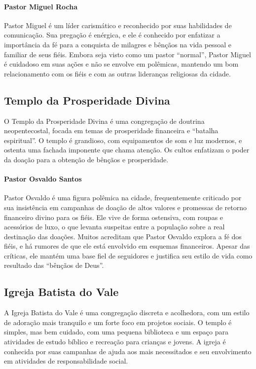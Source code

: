 \paragraph{Pastor Miguel Rocha}  
Pastor Miguel é um líder carismático e reconhecido por suas habilidades de comunicação. Sua pregação é enérgica, e ele é conhecido por enfatizar a importância da fé para a conquista de milagres e bênçãos na vida pessoal e familiar de seus fiéis. Embora seja visto como um pastor “normal”, Pastor Miguel é cuidadoso em suas ações e não se envolve em polêmicas, mantendo um bom relacionamento com os fiéis e com as outras lideranças religiosas da cidade.

\subsection{Templo da Prosperidade Divina}

O Templo da Prosperidade Divina é uma congregação de doutrina neopentecostal, focada em temas de prosperidade financeira e “batalha espiritual”. O templo é grandioso, com equipamentos de som e luz modernos, e ostenta uma fachada imponente que chama atenção. Os cultos enfatizam o poder da doação para a obtenção de bênçãos e prosperidade.

\paragraph{Pastor Osvaldo Santos}  
Pastor Osvaldo é uma figura polêmica na cidade, frequentemente criticado por sua insistência em campanhas de doação de altos valores e promessas de retorno financeiro divino para os fiéis. Ele vive de forma ostensiva, com roupas e acessórios de luxo, o que levanta suspeitas entre a população sobre a real destinação das doações. Muitos acreditam que Pastor Osvaldo explora a fé dos fiéis, e há rumores de que ele está envolvido em esquemas financeiros. Apesar das críticas, ele mantém uma base fiel de seguidores e justifica seu estilo de vida como resultado das “bênçãos de Deus”.

\subsection{Igreja Batista do Vale}

A Igreja Batista do Vale é uma congregação discreta e acolhedora, com um estilo de adoração mais tranquilo e um forte foco em projetos sociais. O templo é simples, mas bem cuidado, com uma pequena biblioteca e um espaço para atividades de estudo bíblico e recreação para crianças e jovens. A igreja é conhecida por suas campanhas de ajuda aos mais necessitados e seu envolvimento em atividades de responsabilidade social.

